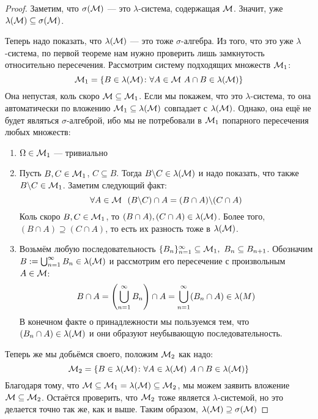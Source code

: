 \begin{proof}
	Заметим, что $\sigma(\mathcal{M})$ --- это $\lambda$-система, содержащая $\mathcal{M}$. Значит, уже $\lambda(\mathcal{M}) \subseteq \sigma(\mathcal{M})$.
	
	Теперь надо показать, что $\lambda(\mathcal{M})$ --- это тоже $\sigma$-алгебра. Из того, что это уже $\lambda$-система, по первой теореме нам нужно проверить лишь замкнутость относительно пересечения. Рассмотрим систему подходящих множеств $\mathcal{M}_1$:
	\[
		\mathcal{M}_1 = \{B \in \lambda(\mathcal{M}) \colon \forall A \in \mathcal{M}\ A \cap B \in \lambda(\mathcal{M})\}
	\]
	Она непустая, коль скоро $\mathcal{M} \subseteq \mathcal{M}_1$. Если мы покажем, что это $\lambda$-система, то она автоматически по вложению $\mathcal{M}_1 \subseteq \lambda(\mathcal{M})$ совпадает с $\lambda(\mathcal{M})$. Однако, она ещё не будет являться $\sigma$-алгеброй, ибо мы не потребовали в $\mathcal{M}_1$ попарного пересечения любых множеств:
	\begin{enumerate}
		\item $\Omega \in \mathcal{M}_1$ --- тривиально
		
		\item Пусть $B, C \in \mathcal{M}_1$, $C \subseteq B$. Тогда $B \backslash C \in \lambda(\mathcal{M})$ и надо показать, что также $B \backslash C \in \mathcal{M}_1$. Заметим следующий факт:
		\[
			\forall A \in \mathcal{M}\ \ (B \backslash C) \cap A = (B \cap A) \backslash (C \cap A)
		\]
		Коль скоро $B, C \in \mathcal{M}_1$, то $(B \cap A), (C \cap A) \in \lambda(\mathcal{M})$. Более того, $(B \cap A) \supseteq (C \cap A)$, то есть их разность тоже в $\lambda(\mathcal{M})$.
		
		\item Возьмём любую последовательность $\{B_n\}_{n = 1}^\infty \subseteq \mathcal{M}_1,\ B_n \subseteq B_{n + 1}$. Обозначим $B := \bigcup_{n = 1}^\infty B_n \in \lambda(\mathcal{M})$ и рассмотрим его пересечение с произвольным $A \in \mathcal{M}$:
		\[
			B \cap A = \left(\bigcup_{n = 1}^\infty B_n\right) \cap A = \bigcup_{n = 1}^\infty (B_n \cap A) \in \lambda(M)
		\]
		В конечном факте о принадлежности мы пользуемся тем, что $(B_n \cap A) \in \lambda(\mathcal{M})$ и они образуют неубывающую последовательность.
	\end{enumerate}
	Теперь же мы добьёмся своего, положим $\mathcal{M}_2$ как надо:
	\[
		\mathcal{M}_2 = \{B \in \lambda(\mathcal{M}) \colon \forall A \in \lambda(\mathcal{M})\ A \cap B \in \lambda(\mathcal{M})\}
	\]
	Благодаря тому, что $\mathcal{M} \subseteq \mathcal{M}_1 = \lambda(\mathcal{M}) \subseteq \mathcal{M}_2$, мы можем заявить вложение $\mathcal{M} \subseteq \mathcal{M}_2$. Остаётся проверить, что $\mathcal{M}_2$ тоже является $\lambda$-системой, но это делается точно так же, как и выше. Таким образом, $\lambda(\mathcal{M}) \supseteq \sigma(\mathcal{M})$
\end{proof}